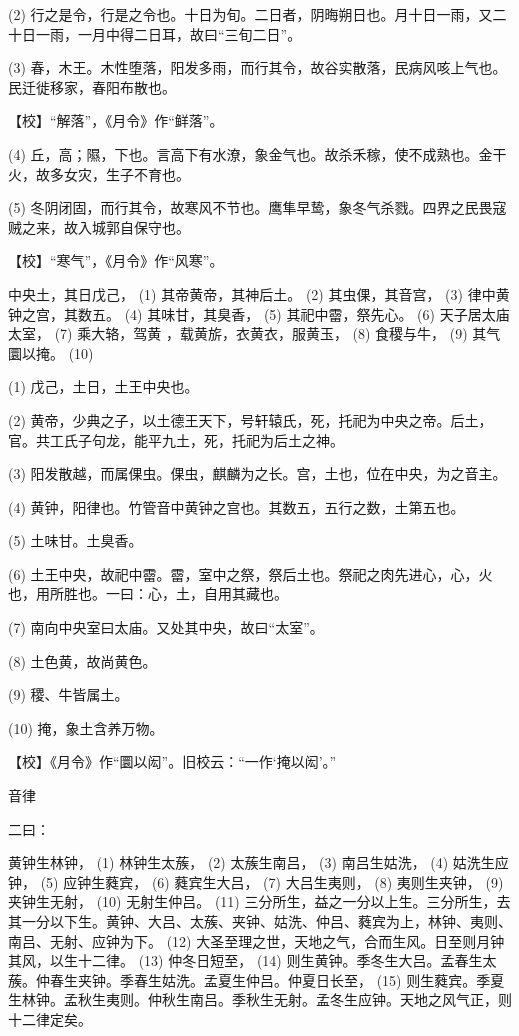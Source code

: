 \documentclass[12pt,UTF8]{ctexbook}
\begin{document}
(2) 行之是令，行是之令也。十日为旬。二日者，阴晦朔日也。月十日一雨，又二十日一雨，一月中得二日耳，故曰“三旬二日”。

(3) 春，木王。木性堕落，阳发多雨，而行其令，故谷实散落，民病风咳上气也。民迁徙移家，春阳布散也。

【校】“解落”，《月令》作“鲜落”。

(4) 丘，高；隰，下也。言高下有水潦，象金气也。故杀禾稼，使不成熟也。金干火，故多女灾，生子不育也。

(5) 冬阴闭固，而行其令，故寒风不节也。鹰隼早鸷，象冬气杀戮。四界之民畏寇贼之来，故入城郭自保守也。

【校】“寒气”，《月令》作“风寒”。

中央土，其日戊己， (1) 其帝黄帝，其神后土。 (2) 其虫倮，其音宫， (3) 律中黄钟之宫，其数五。 (4) 其味甘，其臭香， (5) 其祀中霤，祭先心。 (6) 天子居太庙太室， (7) 乘大辂，驾黄 ，载黄旂，衣黄衣，服黄玉， (8) 食稷与牛， (9) 其气圜以掩。 (10)

(1) 戊己，土日，土王中央也。

(2) 黄帝，少典之子，以土德王天下，号轩辕氏，死，托祀为中央之帝。后土，官。共工氏子句龙，能平九土，死，托祀为后土之神。

(3) 阳发散越，而属倮虫。倮虫，麒麟为之长。宫，土也，位在中央，为之音主。

(4) 黄钟，阳律也。竹管音中黄钟之宫也。其数五，五行之数，土第五也。

(5) 土味甘。土臭香。

(6) 土王中央，故祀中霤。霤，室中之祭，祭后土也。祭祀之肉先进心，心，火也，用所胜也。一曰：心，土，自用其藏也。

(7) 南向中央室曰太庙。又处其中央，故曰“太室”。

(8) 土色黄，故尚黄色。

(9) 稷、牛皆属土。

(10) 掩，象土含养万物。

【校】《月令》作“圜以闳”。旧校云：“一作‘掩以闳’。”





音律


二曰：

黄钟生林钟， (1) 林钟生太蔟， (2) 太蔟生南吕， (3) 南吕生姑洗， (4) 姑洗生应钟， (5) 应钟生蕤宾， (6) 蕤宾生大吕， (7) 大吕生夷则， (8) 夷则生夹钟， (9) 夹钟生无射， (10) 无射生仲吕。 (11) 三分所生，益之一分以上生。三分所生，去其一分以下生。黄钟、大吕、太蔟、夹钟、姑洗、仲吕、蕤宾为上，林钟、夷则、南吕、无射、应钟为下。 (12) 大圣至理之世，天地之气，合而生风。日至则月钟其风，以生十二律。 (13) 仲冬日短至， (14) 则生黄钟。季冬生大吕。孟春生太蔟。仲春生夹钟。季春生姑洗。孟夏生仲吕。仲夏日长至， (15) 则生蕤宾。季夏生林钟。孟秋生夷则。仲秋生南吕。季秋生无射。孟冬生应钟。天地之风气正，则十二律定矣。
\end{document}
